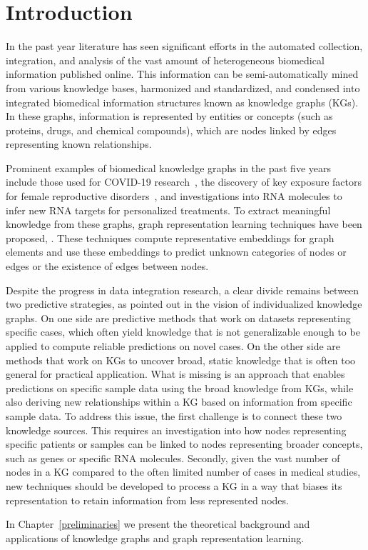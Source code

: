 \chapter{Introduction}
In the past year literature has seen significant efforts in the automated collection, integration, and analysis of the vast amount of heterogeneous biomedical information published online. This information can be semi-automatically mined from various knowledge bases, harmonized and standardized, and condensed into integrated biomedical information structures known as knowledge graphs (KGs). In these graphs, information is represented by entities or concepts (such as proteins, drugs, and chemical compounds), which are nodes linked by edges representing known relationships.

Prominent examples of biomedical knowledge graphs in the past five years include those used for COVID-19 research~\cite{ReeseJustinT.2021KAFt}, the discovery of key exposure factors for female reproductive disorders~\cite{ChanLaurenE2024Pnae}, and investigations into RNA molecules to infer new RNA targets for personalized treatments\cite{CavalleriEmanuele2024Aokg}. To extract meaningful knowledge from these graphs, graph representation learning techniques have been proposed\cite{Hamilton2020GraphRL}, \cite{li2022graphrepresentationlearningbiomedicine}. These techniques compute representative embeddings for graph elements and use these embeddings to predict unknown categories of nodes or edges or the existence of edges between nodes.

Despite the progress in data integration research, a clear divide remains between two predictive strategies, as pointed out in the vision of individualized knowledge graphs\cite{PingPeipei2017IKGA}. On one side are predictive methods that work on datasets representing specific cases, which often yield knowledge that is not generalizable enough to be applied to compute reliable predictions on novel cases. On the other side are methods that work on KGs to uncover broad, static knowledge that is often too general for practical application. What is missing is an approach that enables predictions on specific sample data using the broad knowledge from KGs, while also deriving new relationships within a KG based on information from specific sample data. To address this issue, the first challenge is to connect these two knowledge sources. This requires an investigation into how nodes representing specific patients or samples can be linked to nodes representing broader concepts, such as genes or specific RNA molecules. Secondly, given the vast number of nodes in a KG compared to the often limited number of cases in medical studies, new techniques should be developed to process a KG in a way that biases its representation to retain information from less represented nodes.

In Chapter~\ref{preliminaries} we present the theoretical background and applications of knowledge graphs and graph representation learning.